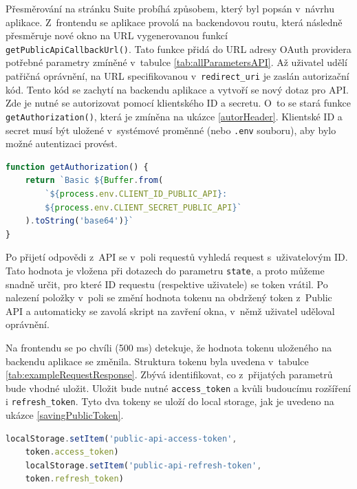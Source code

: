 \documentclass[czech, bc, kiv, he, iso690numb]{fasthesis}
\begin{document}
Přesměrování na stránku Suite probíhá způsobem, který byl popsán v~návrhu aplikace. Z~frontendu se aplikace provolá na backendovou routu, která následně přesměruje nové okno
na URL vygenerovanou funkcí \texttt{getPublicApiCallbackUrl()}. Tato funkce přidá do URL adresy OAuth providera potřebné parametry zmíněné v~tabulce \ref{tab:allParametersAPI}.
Až uživatel udělí patřičná oprávnění, na URL specifikovanou v~\texttt{redirect\_uri} je zaslán autorizační kód. Tento kód se zachytí na backendu aplikace a
vytvoří se nový dotaz pro API. Zde je nutné se autorizovat pomocí klientského ID a secretu. O~to se stará funkce \texttt{getAuthorization()}, která je zmíněna na 
ukázce \ref{autorHeader}. Klientské ID a secret musí být uložené v~systémové proměnné (nebo \texttt{.env} souboru), aby bylo možné autentizaci provést.

\begin{lstlisting}[language=Javascript, caption={Vytvoření autorizační hlavičky pro následnou autentizaci}, label=autorHeader]
function getAuthorization() {
	return `Basic ${Buffer.from(
		`${process.env.CLIENT_ID_PUBLIC_API}:
		${process.env.CLIENT_SECRET_PUBLIC_API}`
	).toString('base64')}`
}
\end{lstlisting}

Po přijetí odpovědi z~API se v~poli requestů vyhledá request s~uživatelovým ID. Tato hodnota je vložena při dotazech do parametru \texttt{state}, a proto můžeme snadně
určit, pro které ID requestu (respektive uživatele) se token vrátil. Po nalezení položky v~poli se změní hodnota tokenu na obdržený token z~Public API a automaticky se
zavolá skript na zavření okna, v~němž uživatel uděloval oprávnění.

Na frontendu se po chvíli (500 ms) detekuje, že hodnota tokenu uloženého na backendu aplikace se změnila. Struktura tokenu byla uvedena v~tabulce \ref{tab:exampleRequestResponse}.
Zbývá identifikovat, co z~přijatých parametrů bude vhodné uložit. Uložit bude nutné \texttt{access\_token} a kvůli budoucímu rozšíření i \texttt{refresh\_token}. Tyto
dva tokeny se uloží do local storage, jak je uvedeno na ukázce \ref{savingPublicToken}.

\begin{lstlisting}[language=Javascript, caption={Ukládání Public API tokenů do local storage}, label=savingPublicToken]
	localStorage.setItem('public-api-access-token', 
	token.access_token)
	localStorage.setItem('public-api-refresh-token', 
	token.refresh_token)
\end{lstlisting}
\end{document}
